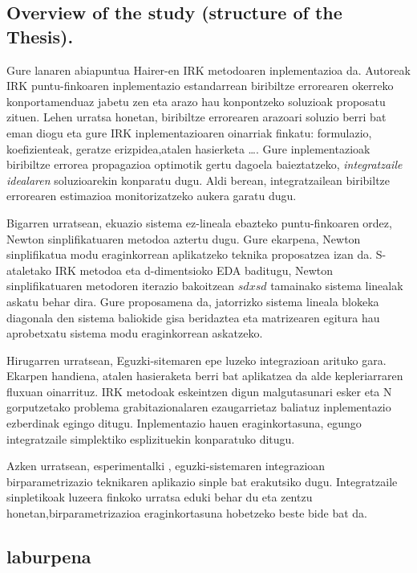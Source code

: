 \subsection{Overview of the study (structure of the Thesis).}

Gure lanaren abiapuntua Hairer-en IRK metodoaren inplementazioa da. Autoreak IRK puntu-finkoaren inplementazio estandarrean biribiltze errorearen okerreko konportamenduaz jabetu zen eta arazo hau konpontzeko soluzioak proposatu zituen. Lehen urratsa honetan, biribiltze errorearen arazoari soluzio berri bat eman diogu eta gure IRK inplementazioaren oinarriak finkatu: formulazio, koefizienteak, geratze erizpidea,atalen hasierketa \dots.
Gure inplementazioak biribiltze errorea propagazioa optimotik gertu dagoela baieztatzeko, \textit {integratzaile idealaren} soluzioarekin konparatu dugu. Aldi berean, integratzailean biribiltze errorearen estimazioa monitorizatzeko aukera garatu dugu.

Bigarren urratsean, ekuazio sistema ez-lineala ebazteko puntu-finkoaren ordez, Newton sinplifikatuaren metodoa aztertu dugu. Gure ekarpena, Newton sinplifikatua modu eraginkorrean aplikatzeko teknika proposatzea izan da. S-ataletako IRK metodoa eta d-dimentsioko EDA baditugu, Newton sinplifikatuaren metodoren iterazio bakoitzean $sdxsd$ tamainako sistema linealak askatu behar dira. Gure proposamena da, jatorrizko sistema lineala blokeka diagonala den sistema baliokide gisa beridaztea eta matrizearen egitura hau aprobetxatu sistema modu eraginkorrean askatzeko.

Hirugarren urratsean, Eguzki-sitemaren epe luzeko integrazioan arituko gara. Ekarpen handiena, atalen hasieraketa berri bat aplikatzea da alde kepleriarraren fluxuan oinarrituz. IRK metodoak eskeintzen digun malgutasunari esker eta N gorputzetako problema grabitazionalaren ezaugarrietaz baliatuz inplementazio ezberdinak egingo ditugu. Inplementazio hauen eraginkortasuna, egungo integratzaile simplektiko esplizituekin konparatuko ditugu.

Azken urratsean, esperimentalki , eguzki-sistemaren integrazioan  birparametrizazio teknikaren aplikazio sinple bat erakutsiko dugu. Integratzaile sinpletikoak luzeera finkoko urratsa eduki behar du eta zentzu honetan,birparametrizazioa eraginkortasuna hobetzeko beste bide bat da.             
      
\subsection{laburpena}

